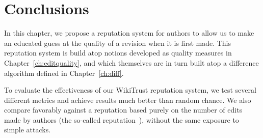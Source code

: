 \section{Conclusions}

In this chapter, we propose a reputation system for authors to allow us
to make an educated guess at the quality of a revision when it is first
made.
This reputation system is build atop notions developed as quality
measures in Chapter~\ref{ch:editquality}, and which themselves are
in turn built atop a difference algorithm defined in Chapter~\ref{ch:diff}.

To evaluate the effectiveness of our WikiTrust reputation system, we
test several different metrics and achieve results much better than
random chance.
We also compare favorably against a reputation based purely on the
number of edits made by authors (the so-called 
reputation~\cite{Cross2006}), without the same exposure to simple
attacks.

